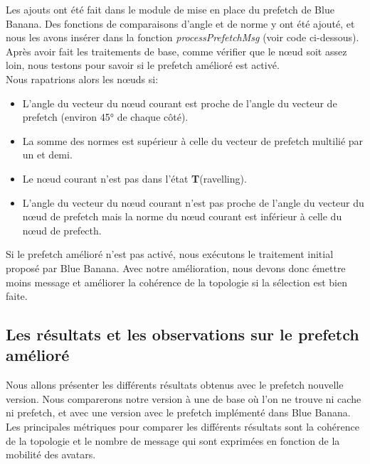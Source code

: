 \par Les ajouts ont été fait dans le module de mise en place du prefetch de Blue Banana. Des fonctions de comparaisons d'angle et de norme y ont été ajouté, et nous les avons insérer dans la fonction \textit{processPrefetchMsg} (voir code ci-dessous). Après avoir fait les traitements de base, comme vérifier que le nœud soit assez loin, nous testons pour savoir si le prefetch amélioré est activé. 
\newline
\\ Nous rapatrions alors les nœuds si:
        \begin{itemize}
        \renewcommand{\labelitemi}{$\bullet$}
                \item L'angle du vecteur du nœud courant est proche de l'angle du vecteur de prefetch (environ 45° de chaque côté).
		\item La somme des normes est supérieur à celle du vecteur de prefetch multilié par un et demi. 
                \item Le nœud courant n'est pas dans l'état \textbf{T}(ravelling).
		\item L'angle du vecteur du nœud courant n'est pas proche de l'angle du vecteur du nœud de prefetch mais la norme du nœud courant est inférieur à celle du nœud de prefecth. 
        \end{itemize}
Si le prefetch amélioré n'est pas activé, nous exécutons le traitement initial proposé par Blue Banana. Avec notre amélioration, nous devons donc émettre moins message et améliorer la cohérence de la topologie si la sélection est bien faite. 

\lstset{numbers=left,basicstyle=\scriptsize, numberstyle=\tiny, stepnumber=5, numbersep=5pt}




\subsection{Les résultats et les observations sur le prefetch amélioré}

Nous allons présenter les différents résultats obtenus avec le prefetch nouvelle version. Nous comparerons notre version à une de base où l'on ne trouve ni cache ni prefetch, et avec une version avec le prefetch implémenté dans Blue Banana. Les principales métriques pour comparer les différents résultats sont la cohérence de la topologie et le nombre de message qui sont exprimées en fonction de la mobilité des avatars.





